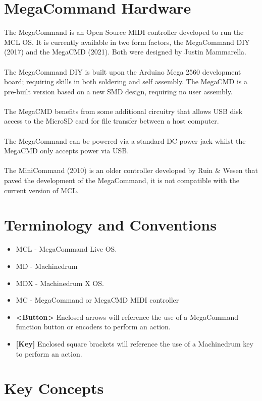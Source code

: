 \chapter{MegaCommand Hardware}
The MegaCommand is an Open Source MIDI controller developed to run the MCL OS. It is currently available in two form factors, the MegaCommand DIY (2017) and the MegaCMD (2021). Both were designed by Justin Mammarella.\\\\
The MegaCommand DIY is built upon the Arduino Mega 2560 development board; requiring skills in both soldering and self assembly. The MegaCMD is a pre-built version based on a new SMD design, requiring no user assembly.\\\\
The MegaCMD benefits from some additional circuitry that allows USB disk access to the MicroSD card for file transfer between a host computer.\\\\
The MegaCommand can be powered via a standard DC power jack whilst the MegaCMD only accepts power via USB.
\\\\
The MiniCommand (2010) is an older controller developed by Ruin \& Wesen that paved the development of the MegaCommand, it is not compatible with the current version of MCL.
\chapter{Terminology and Conventions}
   \begin{itemize}
      \item MCL - MegaCommand Live OS.
      \item MD - Machinedrum
      \item MDX - Machinedrum X OS.
      \item MC - MegaCommand or MegaCMD MIDI controller
      \item \textbf{<Button> } Enclosed arrows will reference the use of a MegaCommand function button or encoders to perform an action.
      \item \textbf{[Key] } Enclosed square brackets will reference the use of a Machinedrum key to perform an action. 
   \end{itemize}


\newpage
\chapter{Key Concepts}

